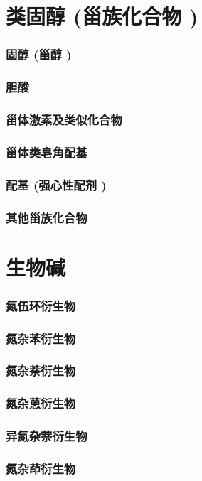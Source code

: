 \documentclass[UTF8]{../03-Chemistry}
\begin{document}
\section{类固醇 (甾族化合物 )}
    \subsubsection{固醇 (甾醇 )}
    \subsubsection{胆酸}
    \subsubsection{甾体激素及类似化合物}
    \subsubsection{甾体类皂角配基}
    \subsubsection{配基 (强心性配剂 )}
    \subsubsection{其他甾族化合物}
\section{生物碱}
    \subsubsection{氮伍环衍生物}
    \subsubsection{氮杂苯衍生物}
    \subsubsection{氮杂萘衍生物}
    \subsubsection{氮杂蒽衍生物}
    \subsubsection{异氮杂萘衍生物}
    \subsubsection{氮杂茚衍生物}
\end{document}
